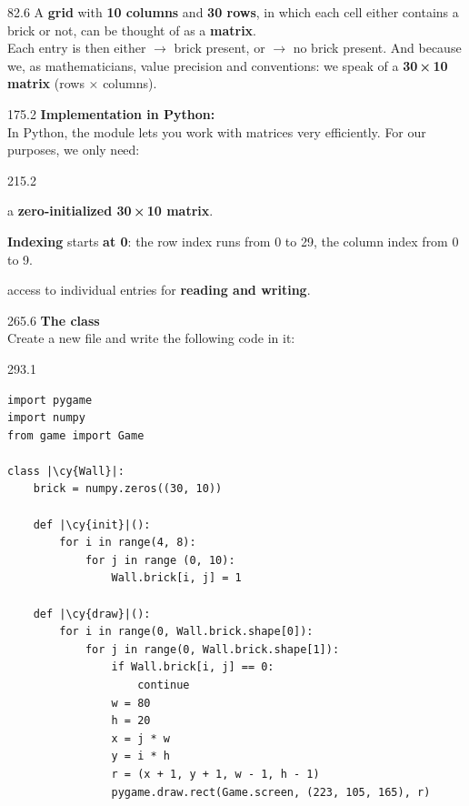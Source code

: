 \documentclass{aslab}
\newcommand*\codemd[1]{{\mdseries\codearg{#1}}}
\newcommand*\cy[1]{\textcolor{codecyan}{#1}}
\begin{document}
\nextpage
\begin{region}[pitch=14.3]{82.6}
A \textbf{grid} with \textbf{10 columns} and \textbf{30 rows}, in which each
cell either contains a brick or not, can be thought of as a
\textbf{matrix}.\\
Each entry is then either  $\rightarrow$ brick present, or 
$\rightarrow$ no brick present. And because we, as mathematicians, value
precision and conventions: we speak of a \textbf{30\,×\,10 matrix} (rows ×
columns).
\end{region}

\begin{region}[pitch=13.6]{175.2}
\textbf{Implementation in Python: \codemd{numpy}}\\
In Python, the module  lets you work with matrices very
efficiently. For our purposes, we only need:
\end{region}

\begin{region}[pitch=14.3]{215.2}
\begin{dashlist}
\item a \textbf{zero-initialized 30\,×\,10 matrix}.
\item \textbf{Indexing} starts \textbf{at 0}: the row index runs from 0 to 29,
  the column index from 0 to 9.
\item access to individual entries for \textbf{reading and writing}.
\end{dashlist}
\end{region}

\begin{region}[pitch=13.6]{265.6}
\textbf{The class \codemd{Wall}}\\
Create a new file  and write the following code in it:
\end{region}

\begin{region}[pitch=13]{293.1}
\begin{lstlisting}[style=pynsmall]
import pygame
import numpy
from game import Game

class |\cy{Wall}|:
    brick = numpy.zeros((30, 10))

    def |\cy{init}|():
        for i in range(4, 8):
            for j in range (0, 10):
                Wall.brick[i, j] = 1

    def |\cy{draw}|():
        for i in range(0, Wall.brick.shape[0]):
            for j in range(0, Wall.brick.shape[1]):
                if Wall.brick[i, j] == 0:
                    continue
                w = 80
                h = 20
                x = j * w
                y = i * h
                r = (x + 1, y + 1, w - 1, h - 1)
                pygame.draw.rect(Game.screen, (223, 105, 165), r)
\end{lstlisting}
\end{region}
\end{document}
